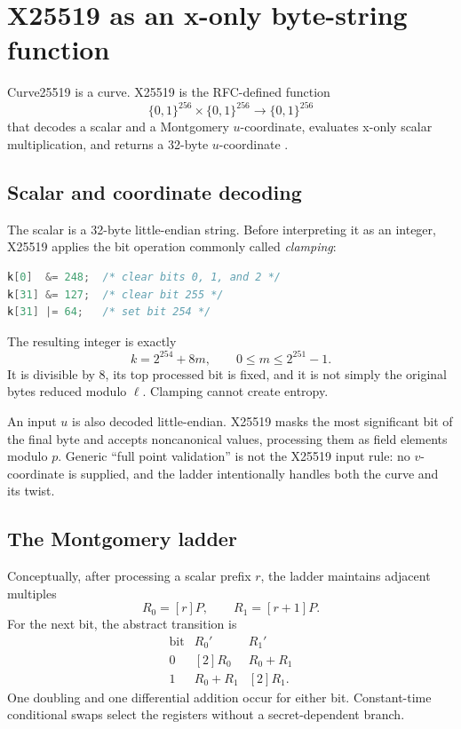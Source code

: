 \section{X25519 as an x-only byte-string function}

Curve25519 is a curve. X25519 is the RFC-defined function
\[
  \{0,1\}^{256}\times\{0,1\}^{256}
  \longrightarrow\{0,1\}^{256}
\]
that decodes a scalar and a Montgomery $u$-coordinate, evaluates x-only scalar
multiplication, and returns a 32-byte $u$-coordinate \cite{rfc7748}.

\subsection{Scalar and coordinate decoding}

The scalar is a 32-byte little-endian string. Before interpreting it as an
integer, X25519 applies the bit operation commonly called \emph{clamping}:

\begin{lstlisting}[language=C]
k[0]  &= 248;  /* clear bits 0, 1, and 2 */
k[31] &= 127;  /* clear bit 255 */
k[31] |= 64;   /* set bit 254 */
\end{lstlisting}

The resulting integer is exactly
\[
  k=2^{254}+8m,
  \qquad 0\le m\le2^{251}-1.
\]
It is divisible by $8$, its top processed bit is fixed, and it is not simply
the original bytes reduced modulo $\ell$. Clamping cannot create entropy.

An input $u$ is also decoded little-endian. X25519 masks the most significant
bit of the final byte and accepts noncanonical values, processing them as field
elements modulo $p$. Generic ``full point validation'' is not the X25519 input
rule: no $v$-coordinate is supplied, and the ladder intentionally handles both
the curve and its twist.

\subsection{The Montgomery ladder}

Conceptually, after processing a scalar prefix $r$, the ladder maintains
adjacent multiples
\[
  R_0=[r]P,
  \qquad
  R_1=[r+1]P.
\]
For the next bit, the abstract transition is
\[
\begin{array}{c|cc}
\text{bit}&R_0'&R_1'\\
\hline
0&[2]R_0&R_0+R_1\\
1&R_0+R_1&[2]R_1.
\end{array}
\]
One doubling and one differential addition occur for either bit. Constant-time
conditional swaps select the registers without a secret-dependent branch.

